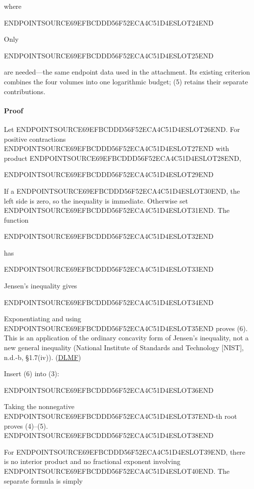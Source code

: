 where

ENDPOINTSOURCE69EFBCDDD56F52ECA4C51D4ESLOT24END

Only

ENDPOINTSOURCE69EFBCDDD56F52ECA4C51D4ESLOT25END

are needed---the same endpoint data used in the attachment. Its existing criterion combines the four volumes into one logarithmic budget; (5) retains their separate contributions.

\paragraph{Proof}\label{endpoint-user_product_original--proof}

Let ENDPOINTSOURCE69EFBCDDD56F52ECA4C51D4ESLOT26END. For positive contractions ENDPOINTSOURCE69EFBCDDD56F52ECA4C51D4ESLOT27END with product ENDPOINTSOURCE69EFBCDDD56F52ECA4C51D4ESLOT28END,

ENDPOINTSOURCE69EFBCDDD56F52ECA4C51D4ESLOT29END

If a ENDPOINTSOURCE69EFBCDDD56F52ECA4C51D4ESLOT30END, the left side is zero, so the inequality is immediate. Otherwise set ENDPOINTSOURCE69EFBCDDD56F52ECA4C51D4ESLOT31END. The function

ENDPOINTSOURCE69EFBCDDD56F52ECA4C51D4ESLOT32END

has

ENDPOINTSOURCE69EFBCDDD56F52ECA4C51D4ESLOT33END

Jensen's inequality gives

ENDPOINTSOURCE69EFBCDDD56F52ECA4C51D4ESLOT34END

Exponentiating and using ENDPOINTSOURCE69EFBCDDD56F52ECA4C51D4ESLOT35END proves (6). This is an application of the ordinary concavity form of Jensen's inequality, not a new general inequality (National Institute of Standards and Technology {[}NIST{]}, n.d.-b, §1.7(iv)). (\href{https://dlmf.nist.gov/1.7?utm_source=chatgpt.com}{DLMF})

Insert (6) into (3):

ENDPOINTSOURCE69EFBCDDD56F52ECA4C51D4ESLOT36END

Taking the nonnegative ENDPOINTSOURCE69EFBCDDD56F52ECA4C51D4ESLOT37END-th root proves (4)--(5). ENDPOINTSOURCE69EFBCDDD56F52ECA4C51D4ESLOT38END

For ENDPOINTSOURCE69EFBCDDD56F52ECA4C51D4ESLOT39END, there is no interior product and no fractional exponent involving ENDPOINTSOURCE69EFBCDDD56F52ECA4C51D4ESLOT40END. The separate formula is simply

